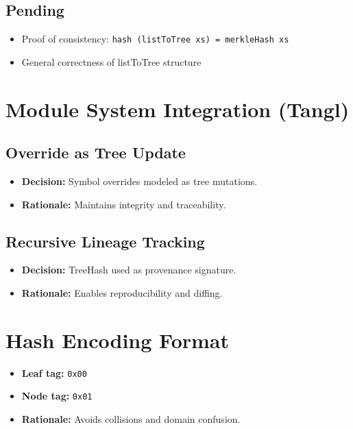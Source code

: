 \documentclass{article}
\begin{document}
\subsection*{Pending}
\begin{itemize}[noitemsep]
  \item Proof of consistency: \texttt{hash (listToTree xs) = merkleHash xs}
  \item General correctness of listToTree structure
\end{itemize}

\section{Module System Integration (Tangl)}

\subsection*{Override as Tree Update}
\begin{itemize}[noitemsep]
  \item \textbf{Decision:} Symbol overrides modeled as tree mutations.
  \item \textbf{Rationale:} Maintains integrity and traceability.
\end{itemize}

\subsection*{Recursive Lineage Tracking}
\begin{itemize}[noitemsep]
  \item \textbf{Decision:} TreeHash used as provenance signature.
  \item \textbf{Rationale:} Enables reproducibility and diffing.
\end{itemize}

\section{Hash Encoding Format}

\begin{itemize}[noitemsep]
  \item \textbf{Leaf tag:} \texttt{0x00}
  \item \textbf{Node tag:} \texttt{0x01}
  \item \textbf{Rationale:} Avoids collisions and domain confusion.
\end{itemize}
\end{document}
